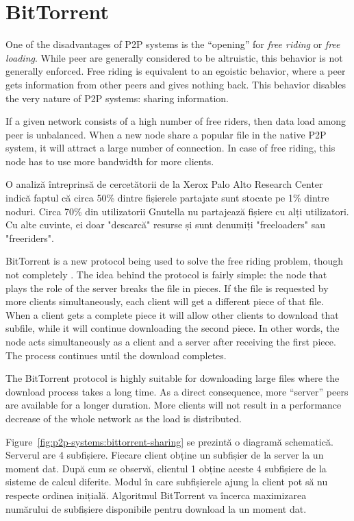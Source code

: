 \section{BitTorrent}
\label{sec:p2p-systems:bittorrent}

One of the disadvantages of P2P systems is the ``opening'' for \textit{free
riding} \cite{free-riding} or \textit{free loading}. While peer are generally
considered to be altruistic, this behavior is not generally enforced. Free
riding is equivalent to an egoistic behavior, where a peer gets information
from other peers and gives nothing back. This behavior disables the very
nature of P2P systems: sharing information.

If a given network consists of a high number of free riders, then data load
among peer is unbalanced. When a new node share a popular file in the native
P2P system, it will attract a large number of connection. In case of free
riding, this node has to use more bandwidth for more clients.

O analiză întreprinsă de cercetătorii de la Xerox Palo Alto Research Center
indică faptul că circa 50\% dintre fișierele partajate sunt stocate pe 1\%
dintre noduri. Circa 70\% din utilizatorii Gnutella nu partajează fișiere cu
alți utilizatori. Cu alte cuvinte, ei doar "descarcă" resurse și sunt denumiți
"freeloaders" sau "freeriders".

BitTorrent is a new protocol being used to solve the free riding problem,
though not completely \cite{free-riding}. The idea behind the protocol is
fairly simple: the node that plays the role of the server breaks the file in
pieces. If the file is requested by more clients simultaneously, each client
will get a different piece of that file. When a client gets a complete piece
it will allow other clients to download that subfile, while it will continue
downloading the second piece. In other words, the node acts simultaneously as
a client and a server after receiving the first piece. The process continues
until the download completes.

The BitTorrent protocol is highly suitable for downloading large files where
the download process takes a long time. As a direct consequence, more
``server'' peers are available for a longer duration. More clients will not
result in a performance decrease of the whole network as the load is
distributed.

Figure~\ref{fig:p2p-systems:bittorrent-sharing} se prezintă o diagramă
schematică.  Serverul are 4 subfișiere. Fiecare client obține un subfișier de
la server la un moment dat.  După cum se observă, clientul 1 obține aceste 4
subfișiere de la sisteme de calcul diferite. Modul în care subfișierele ajung
la client pot să nu respecte ordinea inițială. Algoritmul BitTorrent va
încerca maximizarea numărului de subfișiere disponibile pentru download la un
moment dat.

